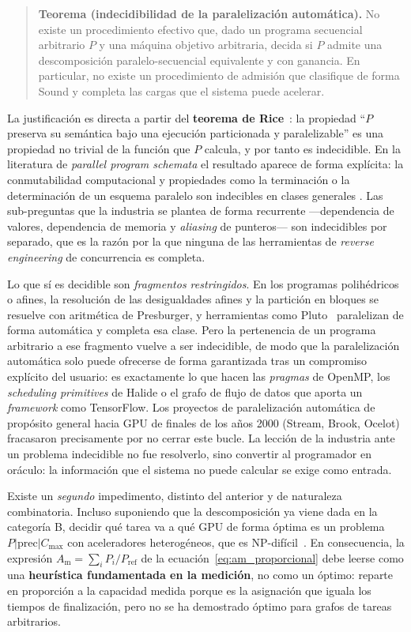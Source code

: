 \documentclass[a4paper,11pt]{article}
\begin{document}
\begin{quote}\small
\textbf{Teorema (indecidibilidad de la paralelización automática).} No existe un procedimiento efectivo que, dado un programa
secuencial arbitrario $P$ y una máquina objetivo arbitraria, decida si $P$ admite una descomposición paralelo-secuencial
equivalente y con ganancia. En particular, no existe un procedimiento de admisión que clasifique de forma Sound y completa las
cargas que el sistema puede acelerar.
\end{quote}\small

La justificación es directa a partir del \textbf{teorema de Rice}~\cite{rice1953}: la propiedad ``$P$ preserva su semántica bajo una
ejecución particionada y paralelizable'' es una propiedad no trivial de la función que $P$ calcula, y por tanto es indecidible.
En la literatura de \textit{parallel program schemata} el resultado aparece de forma explícita: la conmutabilidad computacional y
propiedades como la terminación o la determinación de un esquema paralelo son indecibles en clases generales
\cite{miller1972}. Las sub-preguntas que la industria se plantea de forma recurrente ---dependencia de valores, dependencia de
memoria y \textit{aliasing} de punteros--- son indecidibles por separado, que es la razón por la que ninguna de las
herramientas de \textit{reverse engineering} de concurrencia es completa.

Lo que sí es decidible son \emph{fragmentos restringidos}. En los programas polihédricos o afines, la resolución de las desigualdades
afines y la partición en bloques se resuelve con aritmética de Presburger, y herramientas como Pluto~\cite{darulova2010} paralelizan
de forma automática y completa esa clase. Pero la pertenencia de un programa arbitrario a ese fragmento vuelve a ser indecidible,
de modo que la paralelización automática solo puede ofrecerse de forma garantizada tras un compromiso explícito del usuario: es exactamente lo
que hacen las \textit{pragmas} de OpenMP, los \textit{scheduling primitives} de Halide o el grafo de flujo de datos que aporta un \textit{framework} como
TensorFlow. Los proyectos de paralelización automática de propósito general hacia GPU de finales de los años 2000
(Stream, Brook, Ocelot) fracasaron precisamente por no cerrar este bucle. La lección de la industria ante un problema indecidible
no fue resolverlo, sino convertir al programador en oráculo: la información que el sistema no puede calcular se exige como
entrada.

Existe un \emph{segundo} impedimento, distinto del anterior y de naturaleza combinatoria. Incluso suponiendo que la
descomposición ya viene dada en la categoría B, decidir qué tarea va a qué GPU de forma óptima es un problema
$P|\text{prec}|C_{\max}$ con aceleradores heterogéneos, que es NP-difícil~\cite{graham1969}. En consecuencia, la expresión
$A_{\text{m}} = \sum_i P_i / P_{\text{ref}}$ de la ecuación~\eqref{eq:am_proporcional} debe leerse como una \textbf{heurística
fundamentada en la medición}, no como un óptimo: reparte en proporción a la capacidad medida porque es la asignación que
iguala los tiempos de finalización, pero no se ha demostrado óptimo para grafos de tareas arbitrarios.
\end{document}
